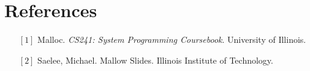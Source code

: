 \documentclass[a4paper,12pt]{article}
\begin{document}
	\section{References}
	\begin{itemize}
		\item[${[1]}$] Malloc. \textit{CS241: System Programming Coursebook}. University of Illinois. 
		\item[${[2]}$] Saelee, Michael. Mallow Slides. Illinois Institute of Technology. 
	\end{itemize}
	

	
\end{document}
